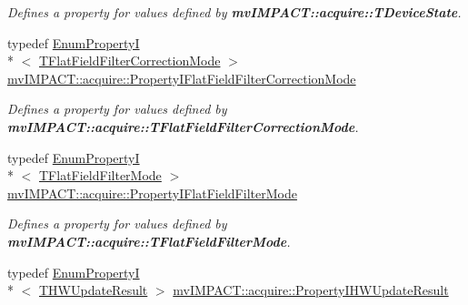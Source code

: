 \begin{DoxyCompactItemize}
\begin{DoxyCompactList}\small\item\em Defines a property for values defined by {\bfseries mv\+I\+M\+P\+A\+C\+T\+::acquire\+::\+T\+Device\+State}. \end{DoxyCompactList}\item 
\hypertarget{group___common_interface_gae5e0a9f8a06ccd71118818818a717a8c}{typedef \hyperlink{classmv_i_m_p_a_c_t_1_1acquire_1_1_enum_property_i}{Enum\+Property\+I}\\*
$<$ \hyperlink{group___common_interface_gadb6a737744f9f4b2d31a5921ca70f474}{T\+Flat\+Field\+Filter\+Correction\+Mode} $>$ \hyperlink{group___common_interface_gae5e0a9f8a06ccd71118818818a717a8c}{mv\+I\+M\+P\+A\+C\+T\+::acquire\+::\+Property\+I\+Flat\+Field\+Filter\+Correction\+Mode}}\label{group___common_interface_gae5e0a9f8a06ccd71118818818a717a8c}

\begin{DoxyCompactList}\small\item\em Defines a property for values defined by {\bfseries mv\+I\+M\+P\+A\+C\+T\+::acquire\+::\+T\+Flat\+Field\+Filter\+Correction\+Mode}. \end{DoxyCompactList}\item 
\hypertarget{group___common_interface_ga135f01ac2dcf8ddcf43ae998eccb394e}{typedef \hyperlink{classmv_i_m_p_a_c_t_1_1acquire_1_1_enum_property_i}{Enum\+Property\+I}\\*
$<$ \hyperlink{group___common_interface_ga40b7d79a1a58736a449305e4447060f8}{T\+Flat\+Field\+Filter\+Mode} $>$ \hyperlink{group___common_interface_ga135f01ac2dcf8ddcf43ae998eccb394e}{mv\+I\+M\+P\+A\+C\+T\+::acquire\+::\+Property\+I\+Flat\+Field\+Filter\+Mode}}\label{group___common_interface_ga135f01ac2dcf8ddcf43ae998eccb394e}

\begin{DoxyCompactList}\small\item\em Defines a property for values defined by {\bfseries mv\+I\+M\+P\+A\+C\+T\+::acquire\+::\+T\+Flat\+Field\+Filter\+Mode}. \end{DoxyCompactList}\item 
\hypertarget{group___common_interface_ga111916e947fe10d171bc6c2a10f15ae2}{typedef \hyperlink{classmv_i_m_p_a_c_t_1_1acquire_1_1_enum_property_i}{Enum\+Property\+I}\\*
$<$ \hyperlink{group___common_interface_ga11e4aee028c717dbe4bd4a9e7d97832e}{T\+H\+W\+Update\+Result} $>$ \hyperlink{group___common_interface_ga111916e947fe10d171bc6c2a10f15ae2}{mv\+I\+M\+P\+A\+C\+T\+::acquire\+::\+Property\+I\+H\+W\+Update\+Result}}\label{group___common_interface_ga111916e947fe10d171bc6c2a10f15ae2}


\end{DoxyCompactItemize}
